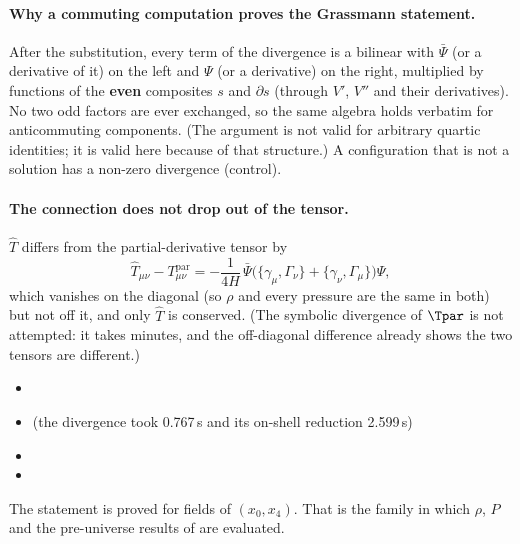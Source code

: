 \paragraph{Why a commuting computation proves the Grassmann statement.} After the substitution,
every term of the divergence is a bilinear with $\bar\Psi$ (or a derivative of it) on the left and
$\Psi$ (or a derivative) on the right, multiplied by functions of the \textbf{even} composites $s$ and
$\partial s$ (through $V'$, $V''$ and their derivatives). No two odd factors are ever exchanged, so
the same algebra holds verbatim for anticommuting components. (The argument is not valid for
arbitrary quartic identities; it is valid here because of that structure.) A configuration that is
not a solution has a non-zero divergence (control).

\paragraph{The connection does not drop out of the tensor.} $\hat T$ differs from the
partial-derivative tensor by
\[
  \hat T_{\mu\nu}-T^{\mathrm{par}}_{\mu\nu}=-\frac{1}{4H}\,\bar\Psi\bigl(\{\gamma_\mu,\Gamma_\nu\}+\{\gamma_\nu,\Gamma_\mu\}\bigr)\Psi ,
\]
which vanishes on the diagonal (so $\rho$ and every pressure are the same in both) but not off it,
and only $\hat T$ is conserved. (The symbolic divergence of $\Tpar$ is not attempted: it takes
minutes, and the off-diagonal difference already shows the two tensors are different.)
\begin{itemize}
  \item {}
  \item {} (the divergence took 0.767\,s and its on-shell
        reduction 2.599\,s)
  \item {}
  \item {}
\end{itemize}
The statement is proved for fields of $(x_0,x_4)$. That is the family in which $\rho$, $P$ and the
pre-universe results of  are evaluated.

